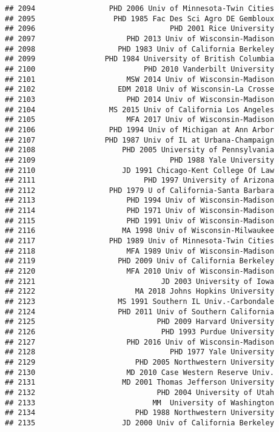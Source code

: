 \documentclass[
]{article}
\begin{document}
\begin{verbatim}
## 2094                 PHD 2006 Univ of Minnesota-Twin Cities
## 2095                  PHD 1985 Fac Des Sci Agro DE Gembloux
## 2096                               PHD 2001 Rice University
## 2097                     PHD 2013 Univ of Wisconsin-Madison
## 2098                   PHD 1983 Univ of California Berkeley
## 2099                PHD 1984 University of British Columbia
## 2100                         PHD 2010 Vanderbilt University
## 2101                     MSW 2014 Univ of Wisconsin-Madison
## 2102                   EDM 2018 Univ of Wisconsin-La Crosse
## 2103                     PHD 2014 Univ of Wisconsin-Madison
## 2104                 MS 2015 Univ of California Los Angeles
## 2105                     MFA 2017 Univ of Wisconsin-Madison
## 2106                 PHD 1994 Univ of Michigan at Ann Arbor
## 2107                PHD 1987 Univ of IL at Urbana-Champaign
## 2108                    PHD 2005 University of Pennsylvania
## 2109                               PHD 1988 Yale University
## 2110                    JD 1991 Chicago-Kent College Of Law
## 2111                         PHD 1997 University of Arizona
## 2112                 PHD 1979 U of California-Santa Barbara
## 2113                     PHD 1994 Univ of Wisconsin-Madison
## 2114                     PHD 1971 Univ of Wisconsin-Madison
## 2115                     PHD 1991 Univ of Wisconsin-Madison
## 2116                    MA 1998 Univ of Wisconsin-Milwaukee
## 2117                 PHD 1989 Univ of Minnesota-Twin Cities
## 2118                     MFA 1989 Univ of Wisconsin-Madison
## 2119                   PHD 2009 Univ of California Berkeley
## 2120                     MFA 2010 Univ of Wisconsin-Madison
## 2121                             JD 2003 University of Iowa
## 2122                       MA 2018 Johns Hopkins University
## 2123                   MS 1991 Southern IL Univ.-Carbondale
## 2124                   PHD 2011 Univ of Southern California
## 2125                            PHD 2009 Harvard University
## 2126                             PHD 1993 Purdue University
## 2127                     PHD 2016 Univ of Wisconsin-Madison
## 2128                               PHD 1977 Yale University
## 2129                       PHD 2005 Northwestern University
## 2130                     MD 2010 Case Western Reserve Univ.
## 2131                    MD 2001 Thomas Jefferson University
## 2132                            PHD 2004 University of Utah
## 2133                           MM  University of Washington
## 2134                       PHD 1988 Northwestern University
## 2135                    JD 2000 Univ of California Berkeley

\end{verbatim}
\end{document}
